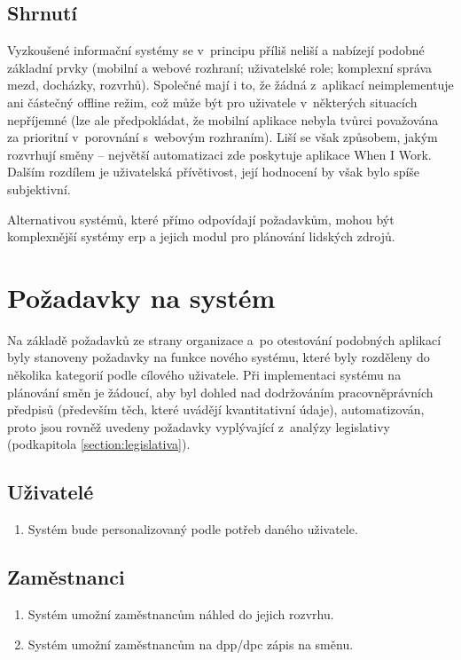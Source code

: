 \documentclass[a4paper,11pt,openany,twoside]{book}
\begin{document}
\subsection{Shrnutí}
Vyzkoušené informační systémy se v~principu příliš neliší a nabízejí podobné základní prvky (mobilní a webové rozhraní; uživatelské role; komplexní správa mezd, docházky, rozvrhů). Společné mají i to, že žádná z~aplikací neimplementuje ani částečný offline režim, což může být pro uživatele v~některých situacích nepříjemné (lze ale předpokládat, že mobilní aplikace nebyla tvůrci považována za prioritní v~porovnání s~webovým rozhraním). Liší se však způsobem, jakým rozvrhují směny -- největší automatizaci zde poskytuje aplikace When I Work. Dalším rozdílem je uživatelská přívětivost, její hodnocení by však bylo spíše subjektivní.

Alternativou systémů, které přímo odpovídají požadavkům, mohou být komplexnější systémy \acs{erp} a jejich modul pro plánování lidských zdrojů.

\section{Požadavky na systém}
Na základě požadavků ze strany organizace a~po otestování podobných aplikací byly stanoveny požadavky na funkce nového systému, které byly rozděleny do několika kategorií podle cílového uživatele. Při implementaci systému na plánování směn je žádoucí, aby byl dohled nad dodržováním pracovněprávních předpisů (především těch, které uvádějí kvantitativní údaje), automatizován, proto jsou rovněž uvedeny požadavky vyplývající z~analýzy legislativy (podkapitola \ref{section:legislativa}).

\subsection*{Uživatelé}
\begin{enumerate}[label=\textbf{U\arabic*.}]
		\item Systém bude personalizovaný podle potřeb daného uživatele.
\end{enumerate}

\subsection*{Zaměstnanci}
\begin{enumerate}[label=\textbf{Z\arabic*.}]
		\item Systém umožní zaměstnancům náhled do jejich rozvrhu.
		\item Systém umožní zaměstnancům na \acs{dpp}/\acs{dpc} zápis na směnu.
\end{enumerate}
\end{document}
